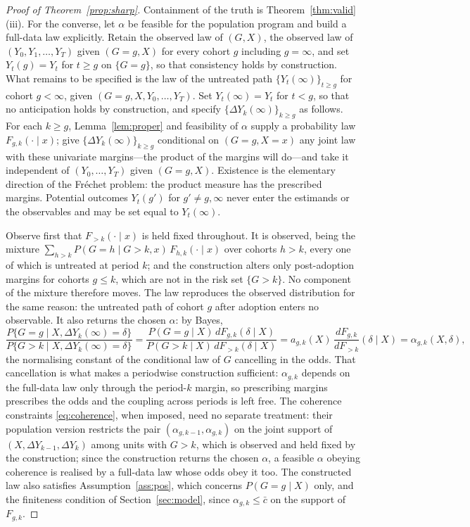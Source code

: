 \documentclass[12pt]{article}
\theoremstyle{remark}
\begin{document}
\begin{proof}[Proof of Theorem~\ref{prop:sharp}]
Containment of the truth is Theorem~\ref{thm:valid}(iii). For the converse, let $\alpha$ be
feasible for the population program and build a full-data law explicitly. Retain the
observed law of $(G, X)$, the observed law of $(Y_0, Y_1, \ldots, Y_T)$ given $(G{=}g, X)$
for every cohort $g$ including $g = \infty$, and set $Y_t(g) = Y_t$ for $t \ge g$ on
$\{G = g\}$, so that consistency holds by construction. What remains to be specified is the
law of the untreated path $\{Y_t(\infty)\}_{t \ge g}$ for cohort $g < \infty$, given
$(G{=}g, X, Y_0, \ldots, Y_T)$. Set $Y_t(\infty) = Y_t$ for $t < g$, so that no
anticipation holds by construction, and specify $\{\Delta Y_k(\infty)\}_{k \ge g}$ as
follows. For each $k \ge g$, Lemma~\ref{lem:proper} and feasibility of $\alpha$ supply a
probability law $F_{g,k}(\cdot \mid x)$; give $\{\Delta Y_k(\infty)\}_{k \ge g}$
conditional on $(G{=}g, X{=}x)$ any joint law with these univariate margins---the product
of the margins will do---and take it independent of $(Y_0, \ldots, Y_T)$ given $(G{=}g, X)$.
Existence is the elementary direction of the Fr\'echet problem: the product measure has
the prescribed margins. Potential outcomes $Y_t(g')$ for $g' \ne g, \infty$ never enter the
estimands or the observables and may be set equal to $Y_t(\infty)$.

Observe first that $F_{>k}(\cdot \mid x)$ is held fixed throughout. It is observed, being
the mixture $\sum_{h>k} P(G{=}h \mid G{>}k, x)\,F_{h,k}(\cdot\mid x)$ over cohorts $h > k$,
every one of which is untreated at period $k$; and the construction alters only
post-adoption margins for cohorts $g \le k$, which are not in the risk set $\{G > k\}$. No
component of the mixture therefore moves. The law reproduces the observed distribution for
the same reason: the untreated path of cohort $g$ after adoption enters no observable. It
also returns the chosen $\alpha$: by Bayes,
\[
\frac{P\{G{=}g \mid X, \Delta Y_k(\infty){=}\delta\}}
     {P\{G{>}k \mid X, \Delta Y_k(\infty){=}\delta\}}
= \frac{P(G{=}g\mid X)\,dF_{g,k}(\delta\mid X)}{P(G{>}k \mid X)\,dF_{>k}(\delta \mid X)}
= a_{g,k}(X)\,\frac{dF_{g,k}}{dF_{>k}}(\delta\mid X)
= \alpha_{g,k}(X,\delta),
\]
the normalising constant of the conditional law of $G$ cancelling in the odds. That
cancellation is what makes a periodwise construction sufficient: $\alpha_{g,k}$ depends on
the full-data law only through the period-$k$ margin, so prescribing margins prescribes the
odds and the coupling across periods is left free. The coherence constraints
\eqref{eq:coherence}, when imposed, need no separate treatment: their population version
restricts the pair $(\alpha_{g,k-1}, \alpha_{g,k})$ on the joint support of
$(X, \Delta Y_{k-1}, \Delta Y_k)$ among units with $G > k$, which is observed and held
fixed by the construction; since the construction returns the chosen $\alpha$, a feasible
$\alpha$ obeying coherence is realised by a full-data law whose odds obey it too. The
constructed law also satisfies Assumption~\ref{ass:pos}, which concerns $P(G{=}g \mid X)$
only, and the finiteness condition of Section~\ref{sec:model}, since
$\alpha_{g,k} \le \bar c$ on the support of $F_{g,k}$.


\end{proof}
\end{document}
